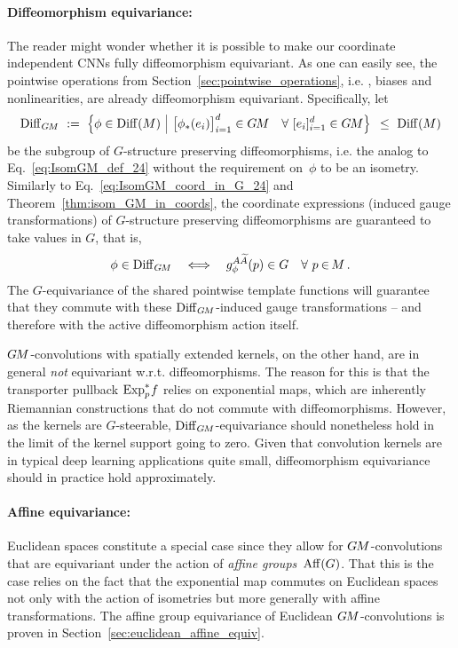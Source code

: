 \paragraph{Diffeomorphism equivariance:}
The reader might wonder whether it is possible to make our coordinate independent CNNs fully diffeomorphism equivariant.
As one can easily see, the pointwise operations from Section~\ref{sec:pointwise_operations}, i.e. \onexones, biases and nonlinearities, are already diffeomorphism equivariant.
Specifically, let
\begin{align}\label{eq:DiffGM_def_part1}
    \DiffGM\ :=\ \pig\{ \phi \in \Diff(M) \ \pig|\ 
    \big[\phi_*(e_i)\big]_{i=1}^d \in \GM \quad \forall\ [e_i]_{i=1}^d \in \GM \pig\} \,\ \leq\ \Diff(M)
\end{align}
be the subgroup of $G$-structure preserving diffeomorphisms, i.e. the analog to Eq.~\eqref{eq:IsomGM_def_24} without the requirement on~$\phi$ to be an isometry.
Similarly to Eq.~\eqref{eq:IsomGM_coord_in_G_24} and Theorem~\ref{thm:isom_GM_in_coords}, the coordinate expressions (induced gauge transformations) of $G$-structure preserving diffeomorphisms are guaranteed to take values in $G$, that is,
\begin{align}
    \phi \in \operatorname{Diff}_{G\mkern-1.4muM} \quad \Longleftrightarrow \quad g_\phi^{A\widetilde{A}}(p) \in G\ \ \ \forall\ p \mkern-1mu\in\mkern-2mu M \,.
\end{align}
The $G$-equivariance of the shared pointwise template functions will guarantee that they commute with these $\operatorname{Diff}_{G\mkern-1.4muM}$-induced gauge transformations -- and therefore with the active diffeomorphism action itself.


$G\mkern-1.4muM$-convolutions with spatially extended kernels, on the other hand, are in general \emph{not} equivariant w.r.t. diffeomorphisms.
The reason for this is that the transporter pullback $\operatorname{Exp}^*_p\mkern-2mu f$ relies on exponential maps, which are inherently Riemannian constructions that do not commute with diffeomorphisms.
However, as the kernels are $G$-steerable, $\operatorname{Diff}_{G\mkern-1.4muM}$-equivariance should nonetheless hold in the limit of the kernel support going to zero.
Given that convolution kernels are in typical deep learning applications quite small, diffeomorphism equivariance should in practice hold approximately.



\paragraph{Affine equivariance:}
Euclidean spaces constitute a special case since they allow for $G\mkern-1.4muM$-convolutions that are equivariant under the action of \emph{affine groups}~$\operatorname{Aff}(G)$.
That this is the case relies on the fact that the exponential map commutes on Euclidean spaces not only with the action of isometries but more generally with affine transformations.
The affine group equivariance of Euclidean $G\mkern-1.4muM$-convolutions is proven in Section~\ref{sec:euclidean_affine_equiv}.
